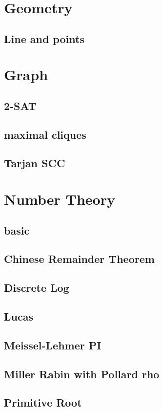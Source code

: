 \section{Geometry}
\subsection{Line and points}


\section{Graph}
\subsection{2-SAT}

\subsection{maximal cliques}

\subsection{Tarjan SCC}


\section{Number Theory}
\subsection{basic}

\subsection{Chinese Remainder Theorem}

\subsection{Discrete Log}

\subsection{Lucas}

\subsection{Meissel-Lehmer PI}

\subsection{Miller Rabin with Pollard rho}

\subsection{Primitive Root}
